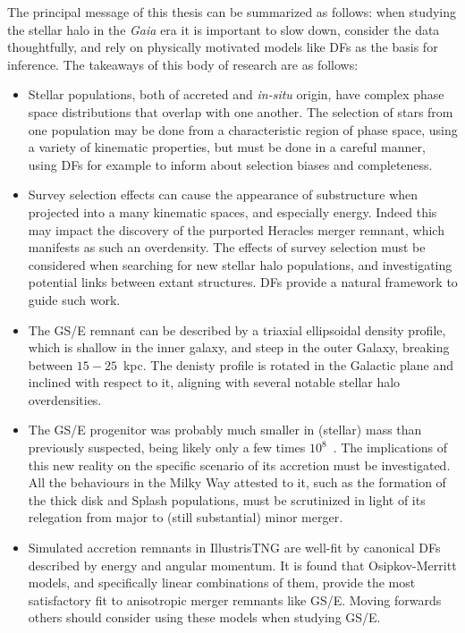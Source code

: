 The principal message of this thesis can be summarized as follows: when studying the stellar halo in the \textit{Gaia} era it is important to slow down, consider the data thoughtfully, and rely on physically motivated models like DFs as the basis for inference. The takeaways of this body of research are as follows:

\begin{itemize}
    \item Stellar populations, both of accreted and \textit{in-situ} origin, have complex phase space distributions that overlap with one another. The selection of stars from one population may be done from a characteristic region of phase space, using a variety of kinematic properties, but must be done in a careful manner, using DFs for example to inform about selection biases and completeness.
    \item Survey selection effects can cause the appearance of substructure when projected into a many kinematic spaces, and especially energy. Indeed this may impact the discovery of the purported Heracles merger remnant, which manifests as such an overdensity. The effects of survey selection must be considered when searching for new stellar halo populations, and investigating potential links between extant structures. DFs provide a natural framework to guide such work.
    \item The GS/E remnant can be described by a triaxial ellipsoidal density profile, which is shallow in the inner galaxy, and steep in the outer Galaxy, breaking between $15-25$~kpc. The denisty profile is rotated in the Galactic plane and inclined with respect to it, aligning with several notable stellar halo overdensities.
    \item The GS/E progenitor was probably much smaller in (stellar) mass than previously suspected, being likely only a few times $10^{8}$~\Msun. The implications of this new reality on the specific scenario of its accretion must be investigated. All the behaviours in the Milky Way attested to it, such as the formation of the thick disk and Splash populations, must be scrutinized in light of its relegation from major to (still substantial) minor merger.
    \item Simulated accretion remnants in IllustrisTNG are well-fit by canonical DFs described by energy and angular momentum. It is found that Osipkov-Merritt models, and specifically linear combinations of them, provide the most satisfactory fit to anisotropic merger remnants like GS/E. Moving forwards others should consider using these models when studying GS/E.
\end{itemize}

